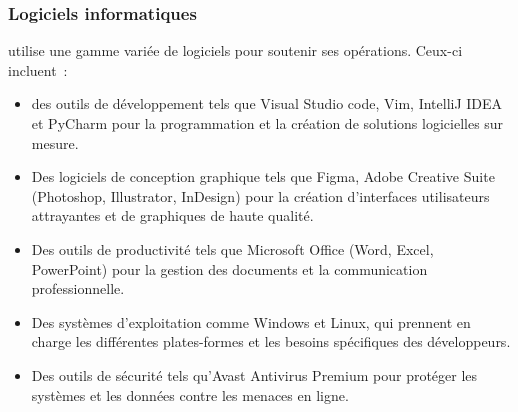 \subsubsection   { Logiciels informatiques }
\firm utilise une gamme variée de logiciels pour soutenir ses opérations. Ceux-ci incluent :
\begin{itemize}

  \item des outils de développement tels que Visual Studio code, Vim, IntelliJ IDEA et
    PyCharm pour la programmation et la création de solutions logicielles sur mesure.
  \item Des logiciels de conception graphique tels que Figma, Adobe Creative Suite
    (Photoshop, Illustrator, InDesign) pour la création d’interfaces utilisateurs
    attrayantes et de graphiques de haute qualité.
  \item Des outils de productivité tels que Microsoft Office (Word, Excel, PowerPoint)
    pour la gestion des documents et la communication professionnelle.
  \item Des systèmes d’exploitation comme Windows et Linux, qui prennent en charge
    les différentes plates-formes et les besoins spécifiques des développeurs.
  \item Des outils de sécurité tels qu’Avast Antivirus Premium pour protéger les
    systèmes et les données contre les menaces en ligne.
\end{itemize}

\newpage



